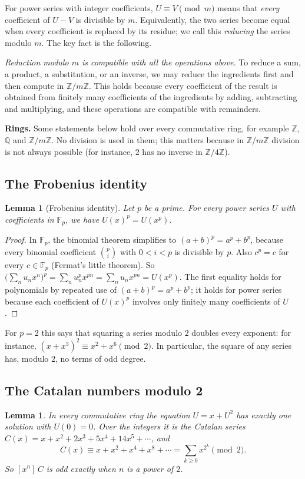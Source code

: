 \documentclass[11pt,a4paper]{article}
\newtheorem{lemma}[theorem]{Lemma}
\theoremstyle{definition}
\theoremstyle{remark}
\newcommand{\Z}{\mathbb{Z}}
\newcommand{\Q}{\mathbb{Q}}
\newcommand{\F}{\mathbb{F}}
\newcommand{\coeff}[2]{[x^{#1}]\,#2}
\newcommand{\para}[1]{\par\medskip\noindent\textbf{#1}\enspace}
\begin{document}
For power series with integer coefficients, $U\equiv V\pmod m$ means that \emph{every} coefficient of $U-V$ is
divisible by $m$. Equivalently, the two series become equal when every coefficient is replaced by its residue; we call
this \emph{reducing} the series modulo $m$. The key fact is the following.

\emph{Reduction modulo $m$ is compatible with all the operations above.} To reduce a sum, a product, a substitution, or
an inverse, we may reduce the ingredients first and then compute in $\Z/m\Z$. This holds because every
coefficient of the result is obtained from finitely many coefficients of the ingredients by adding, subtracting and
multiplying, and these operations are compatible with remainders.

\para{Rings.} Some statements below hold over every commutative ring, for example $\Z$, $\Q$ and $\Z/m\Z$. No
division is used in them; this matters because in $\Z/m\Z$ division is not always possible (for instance, $2$ has no inverse in
$\Z/4\Z$).

\subsection{The Frobenius identity}
\begin{lemma}[Frobenius identity]\label{lem:frobenius}
Let $p$ be a prime. For every power series $U$ with coefficients in $\F_p$, we have $U(x)^p=U(x^p)$.
\end{lemma}

\begin{proof}
In $\F_p$, the binomial theorem simplifies to $(a+b)^p=a^p+b^p$, because every binomial coefficient
$\binom pi$ with $0<i<p$ is divisible by $p$. Also $c^p=c$ for every $c\in\F_p$ (Fermat's little theorem). So
$\bigl(\sum_nu_nx^n\bigr)^p=\sum_nu_n^px^{pn}=\sum_nu_nx^{pn}=U(x^p)$. The first equality holds for polynomials by
repeated use of $(a+b)^p=a^p+b^p$; it holds for power series because each coefficient of $U(x)^p$ involves only finitely
many coefficients of $U$.
\end{proof}

For $p=2$ this says that squaring a series modulo $2$ doubles every exponent: for instance,
$(x+x^3)^2\equiv x^2+x^6\pmod2$. In particular, the square of any series has, modulo $2$, no terms of odd degree.

\subsection{The Catalan numbers modulo 2}
\begin{lemma}\label{lem:catalan}
In every commutative ring the equation $U=x+U^2$ has exactly one solution with $U(0)=0$. Over the integers it is the
Catalan series $C(x)=x+x^2+2x^3+5x^4+14x^5+\cdots$, and
\[
C(x)\equiv x+x^2+x^4+x^8+\cdots=\sum_{k\ge0}x^{2^k}\pmod 2 .
\]
So $\coeff{n}{C}$ is odd exactly when $n$ is a power of $2$.
\end{lemma}
\end{document}
